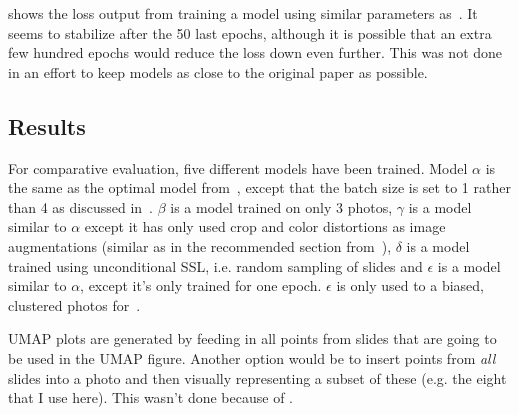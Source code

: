 \documentclass[10pt,twocolumn,letterpaper]{article}
\begin{document}
 shows the loss output from training a model using similar parameters as~\cite{sslUMAP}. It seems to stabilize after the 50 last epochs, although it is possible that an extra few hundred epochs would reduce the loss down even further. This was not done in an effort to keep models as close to the original paper as possible.

\subsection{Results}\label{sec:results}

For comparative evaluation, five different models have been trained. Model $\alpha$ is the same as the optimal model from~\cite{sslUMAP}, except that the batch size is set to 1 rather than 4 as discussed in~. $\beta$ is a model trained on only 3 photos, $\gamma$ is a model similar to $\alpha$ except it has only used crop and color distortions as image augmentations (similar as in the recommended section from~\cite{simCLR}), $\delta$ is a model trained using unconditional \gls{SSL}, i.e. random sampling of slides and $\epsilon$ is a model similar to $\alpha$, except it's only trained for one epoch. $\epsilon$ is only used to a biased, clustered photos for~.

\gls{UMAP} plots are generated by feeding in all points from slides that are going to be used in the \gls{UMAP} figure. Another option would be to insert points from \textit{all} slides into a photo and then visually representing a subset of these (e.g. the eight that I use here). This wasn't done because of .%
\end{document}
